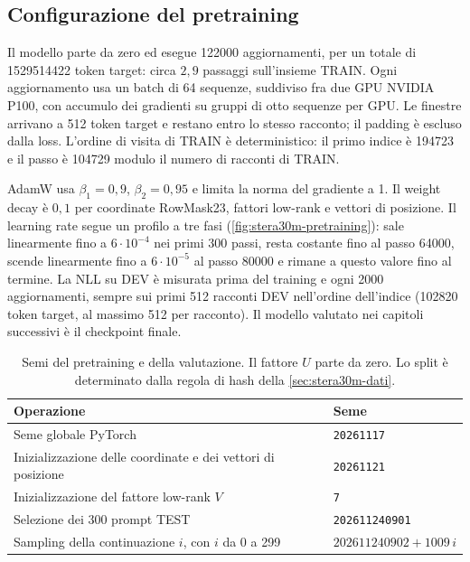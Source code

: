 \subsection{Configurazione del pretraining}
\label{sec:stera30m-config-training}

Il modello parte da zero ed esegue \num{122000} aggiornamenti, per un totale di \num{1529514422} token target: circa $2{,}9$ passaggi sull'insieme TRAIN. Ogni aggiornamento usa un batch di 64 sequenze, suddiviso fra due GPU NVIDIA P100, con accumulo dei gradienti su gruppi di otto sequenze per GPU. Le finestre arrivano a 512 token target e restano entro lo stesso racconto; il padding è escluso dalla loss. L'ordine di visita di TRAIN è deterministico: il primo indice è \num{194723} e il passo è \num{104729} modulo il numero di racconti di TRAIN.

AdamW usa $\beta_1=0{,}9$, $\beta_2=0{,}95$ e limita la norma del gradiente a 1. Il weight decay è $0{,}1$ per coordinate RowMask23, fattori low-rank e vettori di posizione. Il learning rate segue un profilo a tre fasi (\autoref{fig:stera30m-pretraining}): sale linearmente fino a $6\cdot10^{-4}$ nei primi 300 passi, resta costante fino al passo \num{64000}, scende linearmente fino a $6\cdot10^{-5}$ al passo \num{80000} e rimane a questo valore fino al termine. La NLL su DEV è misurata prima del training e ogni \num{2000} aggiornamenti, sempre sui primi 512 racconti DEV nell'ordine dell'indice (\num{102820} token target, al massimo 512 per racconto). Il modello valutato nei capitoli successivi è il checkpoint finale.

\begin{table}[H]
\centering
\small
\begin{tabularx}{\linewidth}{Xl}
\toprule
Operazione & Seme \\
\midrule
Seme globale PyTorch & \texttt{20261117} \\
Inizializzazione delle coordinate e dei vettori di posizione & \texttt{20261121} \\
Inizializzazione del fattore low-rank $V$ & \texttt{7} \\
Selezione dei 300 prompt TEST & \texttt{202611240901} \\
Sampling della continuazione $i$, con $i$ da 0 a 299 & $202611240902+1009\,i$ \\
\bottomrule
\end{tabularx}
\caption{Semi del pretraining e della valutazione. Il fattore $U$ parte da zero. Lo split è determinato dalla regola di hash della \autoref{sec:stera30m-dati}.}
\label{tab:stera30m-seed}
\end{table}



